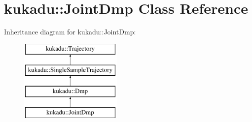 \hypertarget{classkukadu_1_1JointDmp}{\section{kukadu\-:\-:Joint\-Dmp Class Reference}
\label{classkukadu_1_1JointDmp}
}
Inheritance diagram for kukadu\-:\-:Joint\-Dmp\-:\begin{figure}[H]
\begin{center}
\leavevmode
\includegraphics[height=4.000000cm]{classkukadu_1_1JointDmp}
\end{center}
\end{figure}
